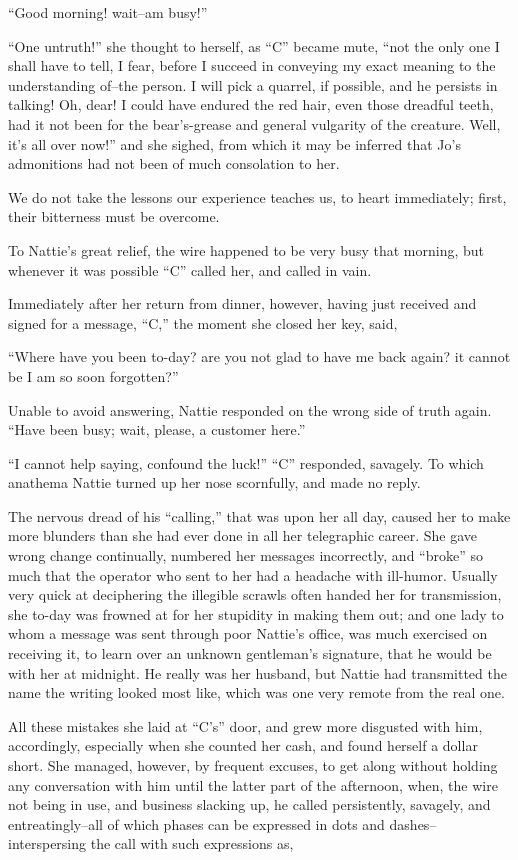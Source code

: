 ``Good morning! wait--am busy!''

``One untruth!'' she thought to herself, as ``C'' became mute, ``not the only
one I shall have to tell, I fear, before I succeed in conveying my exact
meaning to the understanding of--the person. I will pick a quarrel, if
possible, and he persists in talking! Oh, dear! I could have endured the
red hair, even those dreadful teeth, had it not been for the
bear's-grease and general vulgarity of the creature. Well, it's all over
now!'' and she sighed, from which it may be inferred that Jo's
admonitions had not been of much consolation to her.

We do not take the lessons our experience teaches us, to heart
immediately; first, their bitterness must be overcome.

To Nattie's great relief, the wire happened to be very busy that
morning, but whenever it was possible ``C'' called her, and called in
vain.

Immediately after her return from dinner, however, having just received
and signed for a message, ``C,'' the moment she closed her key, said,

``Where have you been to-day? are you not glad to have me back again? it
cannot be I am so soon forgotten?''

Unable to avoid answering, Nattie responded on the wrong side of truth
again. ``Have been busy; wait, please, a customer here.''

``I cannot help saying, confound the luck!'' ``C'' responded, savagely. To
which anathema Nattie turned up her nose scornfully, and made no reply.

The nervous dread of his ``calling,'' that was upon her all day, caused
her to make more blunders than she had ever done in all her telegraphic
career. She gave wrong change continually, numbered her messages
incorrectly, and ``broke'' so much that the operator who sent to her had a
headache with ill-humor. Usually very quick at deciphering the illegible
scrawls often handed her for transmission, she to-day was frowned at for
her stupidity in making them out; and one lady to whom a message was
sent through poor Nattie's office, was much exercised on receiving it,
to learn over an unknown gentleman's signature, that he would be with
her at midnight. He really was her husband, but Nattie had transmitted
the name the writing looked most like, which was one very remote from
the real one.

All these mistakes she laid at ``C's'' door, and grew more disgusted with
him, accordingly, especially when she counted her cash, and found
herself a dollar short. She managed, however, by frequent excuses, to
get along without holding any conversation with him until the latter
part of the afternoon, when, the wire not being in use, and business
slacking up, he called persistently, savagely, and entreatingly--all of
which phases can be expressed in dots and dashes--interspersing the call
with such expressions as,

